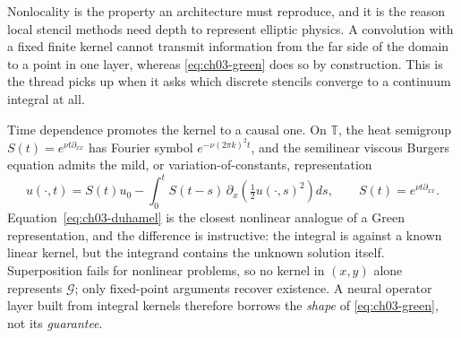 Nonlocality is the property an architecture must reproduce, and it is the reason
local stencil methods need depth to represent elliptic physics. A convolution
with a fixed finite kernel cannot transmit information from the far side of the
domain to a point in one layer, whereas \eqref{eq:ch03-green} does so by
construction. This is the thread 
picks up when it asks which discrete stencils converge to a continuum integral
at all.

Time dependence promotes the kernel to a causal one. On $\mathbb{T}$, the heat
semigroup $S(t) = e^{\nu t \partial_{xx}}$ has Fourier symbol
$e^{-\nu (2\pi k)^2 t}$, and the semilinear viscous Burgers equation admits the
mild, or variation-of-constants, representation
\begin{equation}
  u(\cdot, t) = S(t) u_0 - \int_0^t S(t-s)\, \partial_x\!\left(\tfrac{1}{2} u(\cdot, s)^2\right) ds,
  \qquad S(t) = e^{\nu t \partial_{xx}}.
  \label{eq:ch03-duhamel}
\end{equation}
Equation~\eqref{eq:ch03-duhamel} is the closest nonlinear analogue of a Green
representation, and the difference is instructive: the integral is against a
known linear kernel, but the integrand contains the unknown solution itself.
Superposition fails for nonlinear problems, so no kernel in $(x,y)$ alone
represents $\mathcal{G}$; only fixed-point arguments recover existence. A neural
operator layer built from integral kernels therefore borrows the \emph{shape} of
\eqref{eq:ch03-green}, not its \emph{guarantee}.


